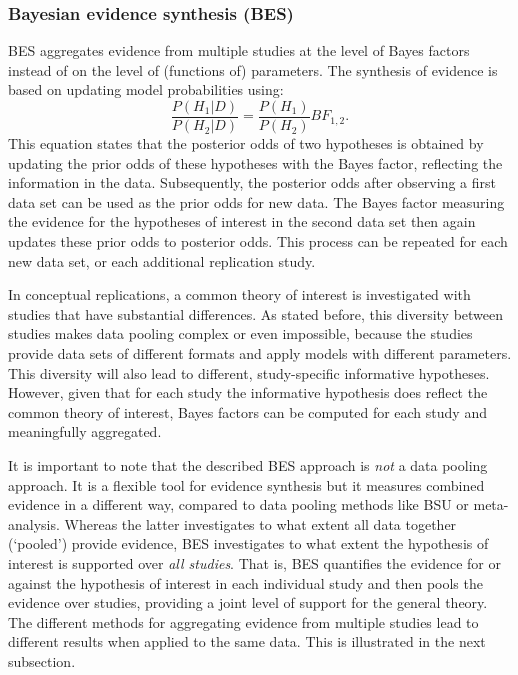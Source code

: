 \documentclass[11pt,reqno]{article}
\begin{document}
\subsubsection{Bayesian evidence synthesis (BES)}

BES aggregates evidence from multiple studies at the level of Bayes factors instead of on the level of (functions of) parameters. The synthesis of evidence is based on updating model probabilities using:
\begin{equation}\label{odds}
  \frac{P(H_1|D)}{P(H_2|D)}=\frac{P(H_1)}{P(H_2)}BF_{1,2}.
\end{equation}
This equation states that the posterior odds of two hypotheses is obtained by updating the prior odds of these hypotheses with the Bayes factor, reflecting the information in the data. 
Subsequently, the posterior odds after observing a first data set can be used as the prior odds for new data. The Bayes factor measuring the evidence for the hypotheses of interest in the second data set then again updates these prior odds to posterior odds. This process can be repeated for each new data set, or each additional replication study.

In conceptual replications, a common theory of interest is investigated with studies that have substantial differences. As stated before, this diversity between studies makes data pooling complex or even impossible, because the studies provide data sets of different formats and apply models with different parameters. This diversity will also lead to different, study-specific informative hypotheses. However, given that for each study the informative hypothesis does reflect the common theory of interest, Bayes factors can be computed for each study and meaningfully aggregated.

It is important to note that the described BES approach is \emph{not} a data pooling approach. It is a flexible tool for evidence synthesis but it measures combined evidence in a different way, compared to data pooling methods like BSU or meta-analysis. 
Whereas the latter investigates to what extent all data together (`pooled') provide evidence, BES investigates to what extent the hypothesis of interest is supported over \emph{all studies}. 
That is, BES quantifies the evidence for or against the hypothesis of interest in each individual study and then pools the evidence over studies, providing a joint level of support for the general theory. The different methods for aggregating evidence from multiple studies lead to different results when applied to the same data. This is illustrated in the next subsection.
\end{document}
